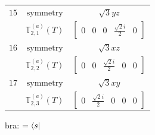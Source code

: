\documentclass[fleqn,8pt,landscape]{jsarticle}
\begin{document}
\begin{longtable}{ccc}
$ 15 $ & $ \text{symmetry} $ & $ \sqrt{3} y z $ \\
$  $ & $ \mathbb{T}_{2,1}^{(a)}(T) $ & $ \begin{bmatrix} 0 & 0 & 0 & \frac{\sqrt{2} i}{2} & 0 \end{bmatrix} $ \\ \hline
$ 16 $ & $ \text{symmetry} $ & $ \sqrt{3} x z $ \\
$  $ & $ \mathbb{T}_{2,2}^{(a)}(T) $ & $ \begin{bmatrix} 0 & 0 & \frac{\sqrt{2} i}{2} & 0 & 0 \end{bmatrix} $ \\ \hline
$ 17 $ & $ \text{symmetry} $ & $ \sqrt{3} x y $ \\
$  $ & $ \mathbb{T}_{2,3}^{(a)}(T) $ & $ \begin{bmatrix} 0 & \frac{\sqrt{2} i}{2} & 0 & 0 & 0 \end{bmatrix} $ \\ \hline
\end{longtable}
bra: $=\bra{s}$
\end{document}
